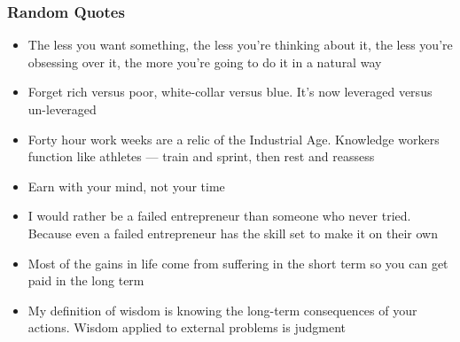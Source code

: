 \begin{frame}[fragile]\frametitle{ Random Quotes}

\begin{itemize}
\item The less you want something, the less you’re thinking about it, the less you’re obsessing over it, the more you’re going to do it in a natural way
 
\item Forget rich versus poor, white-collar versus blue. It’s now leveraged versus un-leveraged
 
\item Forty hour work weeks are a relic of the Industrial Age. Knowledge workers function like athletes — train and sprint, then rest and reassess
 
\item Earn with your mind, not your time
 
\item I would rather be a failed entrepreneur than someone who never tried. Because even a failed entrepreneur has the skill set to make it on their own
 
\item Most of the gains in life come from suffering in the short term so you can get paid in the long term
 
\item My definition of wisdom is knowing the long-term consequences of your actions. Wisdom applied to external problems is judgment
\end{itemize}

\end{frame}


